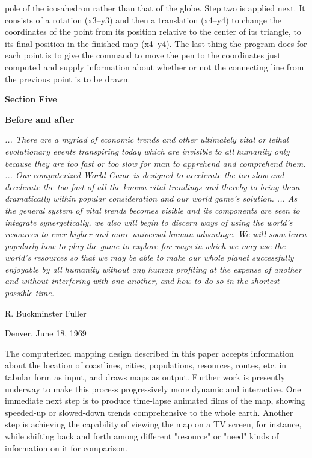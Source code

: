 pole of the icosahedron rather than that of the globe.
\bigskip\flushpar
Step two is applied next.  It consists of a
rotation (x3--y3) and then a translation (x4--y4) to
change the coordinates of the point from its position
relative to the center of its triangle, to its final
position in the finished map (x4--y4).
\bigskip\flushpar
The last thing the program does for each point is
to give the command to move the pen to the coordinates
just computed and supply information about whether or
not the connecting line from the previous point is to
be drawn.
\vfill\eject
\centerline{\bf Section Five}
\bigskip\centerline{\bf Before and after}
\bigskip\bigskip
{\narrower\it\flushpar
... There are a myriad of economic
trends and other ultimately vital or
lethal evolutionary events transpiring
today which are invisible to
all humanity only because they are
too fast or too slow for man to apprehend
and comprehend them.
\bigskip\flushpar
... Our computerized World Game is
designed to accelerate the too slow
and decelerate the too fast of all
the known vital trendings and thereby
to bring them dramatically within
popular consideration and our world
game's solution.
\bigskip\flushpar
... As the general system of vital
trends becomes visible and its components
are seen to integrate synergetically,
we also will begin to discern
ways of using the world's resources
to ever higher and more universal
human advantage.  We will soon
learn popularly how to play the game
to explore for ways in which we may
use the world's resources so that we
may be able to make our whole planet
successfully enjoyable by all humanity
without any human profiting at the
expense of another and without interfering
with one another, and how to
do so in the shortest possible time.
\bigskip\par
R. Buckminster Fuller
\smallskip\par
Denver, June 18, 1969\bigskip}
\bigskip\flushpar
The computerized mapping design described in
this paper accepts information about the location of
coastlines, cities, populations, resources, routes,
etc. in tabular form as input, and draws maps as output.
\bigskip\flushpar
Further work is presently underway to make this
process progressively more dynamic and interactive.
One immediate next step is to produce time-lapse
animated films of the map, showing speeded-up or
slowed-down trends comprehensive to the whole earth.
Another step is achieving the capability of viewing
the map on a TV screen, for instance, while shifting
back and forth among different "resource" or "need"
kinds of information on it for comparison.
\vfill\eject
\bye
